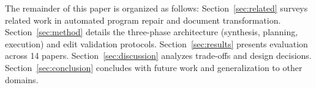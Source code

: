 The remainder of this paper is organized as follows: Section~\ref{sec:related} surveys related work in automated program repair and document transformation. Section~\ref{sec:method} details the three-phase architecture (synthesis, planning, execution) and edit validation protocols. Section~\ref{sec:results} presents evaluation across 14 papers. Section~\ref{sec:discussion} analyzes trade-offs and design decisions. Section~\ref{sec:conclusion} concludes with future work and generalization to other domains.